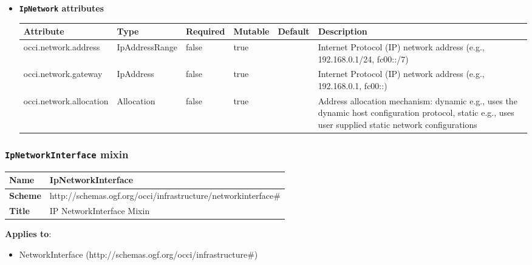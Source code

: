 \begin{itemize}
\item \textbf{\texttt{IpNetwork} attributes}

\begin{tabularx}{\textwidth}{|l|l|p{1.4cm}|p{1.3cm}|l|X|}
  \hline
  \textbf{Attribute} & \textbf{Type} & \textbf{Required} & \textbf{Mutable} & \textbf{Default} & \textbf{Description} \\
  \hline  
  occi.network.address & IpAddressRange & false & true &  & Internet Protocol (IP) network address (e.g., 192.168.0.1/24, fc00::/7) \\
  \hline
  occi.network.gateway & IpAddress & false & true &  & Internet Protocol (IP) network address (e.g., 192.168.0.1, fc00::) \\
  \hline
  occi.network.allocation & Allocation & false & true &  & Address allocation mechanism: dynamic e.g., uses the dynamic host configuration protocol, static e.g., uses user supplied static network configurations \\
  \hline
\end{tabularx}
\end{itemize}


\subsubsection{\texttt{IpNetworkInterface} mixin}
\begin{center}
\begin{tabular}{|l|l|}
  \hline
  \textbf{Name} & IpNetworkInterface \\
  \hline  
  \textbf{Scheme} & http://schemas.ogf.org/occi/infrastructure/networkinterface\# \\
  \hline
  \textbf{Title} & IP NetworkInterface Mixin \\
  \hline
\end{tabular}
\end{center}
\textbf{Applies to}:
\begin{itemize}
	\item NetworkInterface (http://schemas.ogf.org/occi/infrastructure\#)
\end{itemize}

